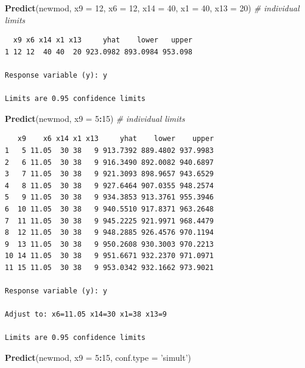 \documentclass[]{book}
\newenvironment{Shaded}{\begin{snugshade}}{\end{snugshade}}
\newcommand{\KeywordTok}[1]{\textcolor[rgb]{0.13,0.29,0.53}{\textbf{#1}}}
\newcommand{\DataTypeTok}[1]{\textcolor[rgb]{0.13,0.29,0.53}{#1}}
\newcommand{\DecValTok}[1]{\textcolor[rgb]{0.00,0.00,0.81}{#1}}
\newcommand{\StringTok}[1]{\textcolor[rgb]{0.31,0.60,0.02}{#1}}
\newcommand{\CommentTok}[1]{\textcolor[rgb]{0.56,0.35,0.01}{\textit{#1}}}
\newcommand{\OperatorTok}[1]{\textcolor[rgb]{0.81,0.36,0.00}{\textbf{#1}}}
\newcommand{\NormalTok}[1]{#1}
\theoremstyle{definition}
\theoremstyle{definition}
\theoremstyle{definition}
\theoremstyle{remark}
\begin{document}
\begin{Shaded}
\begin{Highlighting}[]
\KeywordTok{Predict}\NormalTok{(newmod, }\DataTypeTok{x9 =} \DecValTok{12}\NormalTok{, }\DataTypeTok{x6 =} \DecValTok{12}\NormalTok{, }\DataTypeTok{x14 =} \DecValTok{40}\NormalTok{, }\DataTypeTok{x1 =} \DecValTok{40}\NormalTok{, }\DataTypeTok{x13 =} \DecValTok{20}\NormalTok{) }\CommentTok{# individual limits}
\end{Highlighting}
\end{Shaded}

\begin{verbatim}
  x9 x6 x14 x1 x13     yhat    lower   upper
1 12 12  40 40  20 923.0982 893.0984 953.098

Response variable (y): y 

Limits are 0.95 confidence limits
\end{verbatim}

\begin{Shaded}
\begin{Highlighting}[]
\KeywordTok{Predict}\NormalTok{(newmod, }\DataTypeTok{x9 =} \DecValTok{5}\OperatorTok{:}\DecValTok{15}\NormalTok{) }\CommentTok{# individual limits}
\end{Highlighting}
\end{Shaded}

\begin{verbatim}
   x9    x6 x14 x1 x13     yhat    lower    upper
1   5 11.05  30 38   9 913.7392 889.4802 937.9983
2   6 11.05  30 38   9 916.3490 892.0082 940.6897
3   7 11.05  30 38   9 921.3093 898.9657 943.6529
4   8 11.05  30 38   9 927.6464 907.0355 948.2574
5   9 11.05  30 38   9 934.3853 913.3761 955.3946
6  10 11.05  30 38   9 940.5510 917.8371 963.2648
7  11 11.05  30 38   9 945.2225 921.9971 968.4479
8  12 11.05  30 38   9 948.2885 926.4576 970.1194
9  13 11.05  30 38   9 950.2608 930.3003 970.2213
10 14 11.05  30 38   9 951.6671 932.2370 971.0971
11 15 11.05  30 38   9 953.0342 932.1662 973.9021

Response variable (y): y 

Adjust to: x6=11.05 x14=30 x1=38 x13=9  

Limits are 0.95 confidence limits
\end{verbatim}

\begin{Shaded}
\begin{Highlighting}[]
\KeywordTok{Predict}\NormalTok{(newmod, }\DataTypeTok{x9 =} \DecValTok{5}\OperatorTok{:}\DecValTok{15}\NormalTok{, }\DataTypeTok{conf.type =} \StringTok{'simult'}\NormalTok{)}
\end{Highlighting}
\end{Shaded}
\end{document}
